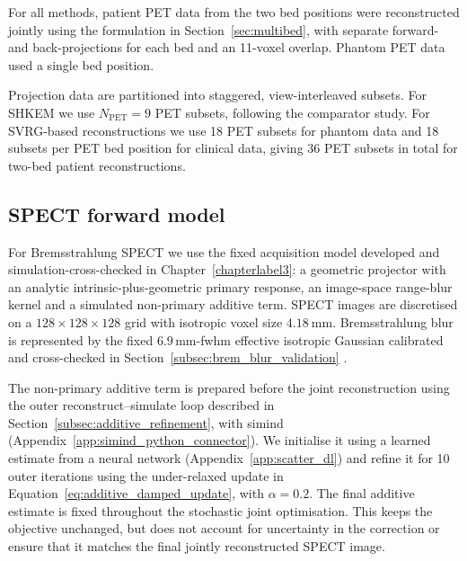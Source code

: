 For all methods, patient PET data from the two bed positions were reconstructed jointly using the formulation in Section~\ref{sec:multibed}, with separate forward- and back-projections for each bed and an 11-voxel overlap. Phantom PET data used a single bed position.

Projection data are partitioned into staggered, view-interleaved subsets. For SHKEM we use $N_{\mathrm{PET}}=9$ PET subsets, following the comparator study. For SVRG-based reconstructions we use 18 PET subsets for phantom data and 18 subsets per PET bed position for clinical data, giving 36 PET subsets in total for two-bed patient reconstructions.

\subsection{SPECT forward model}
\label{subsec:90y_spect_forward}

For Bremsstrahlung SPECT we use the fixed acquisition model developed and simulation-cross-checked in Chapter~\ref{chapterlabel3}: a geometric projector with an analytic intrinsic-plus-geometric primary response, an image-space range-blur kernel and a simulated non-primary additive term. SPECT images are discretised on a $128\times128\times128$ grid with isotropic voxel size $4.18~\mathrm{mm}$. Bremsstrahlung blur is represented by the fixed $6.9\,\mathrm{mm}$-\gls{fwhm} effective isotropic Gaussian calibrated and cross-checked in Section~\ref{subsec:brem_blur_validation} \cite{raultFastSimulationYttrium902010}.

The non-primary additive term is prepared before the joint reconstruction using the outer reconstruct--simulate loop described in Section~\ref{subsec:additive_refinement}, with \gls{simind} \cite{dewarajaImprovedQuantitative90Y2017,ljungberg_monte_1989,rongDevelopmentEvaluationImproved2012} (Appendix~\ref{app:simind_python_connector}). We initialise it using a learned estimate from a neural network \cite{xiangDeepNeuralNetwork2020} (Appendix~\ref{app:scatter_dl}) and refine it for 10 outer iterations using the under-relaxed update in Equation~\eqref{eq:additive_damped_update}, with $\alpha=0.2$. The final additive estimate is fixed throughout the stochastic joint optimisation. This keeps the objective unchanged, but does not account for uncertainty in the correction or ensure that it matches the final jointly reconstructed SPECT image.

